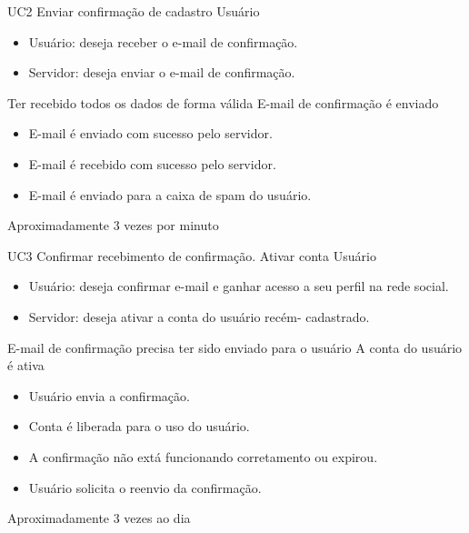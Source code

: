 \casoDeUso
{UC2}
{Enviar confirmação de cadastro}
{Usuário}
{
\begin{itemize}
	\item Usuário: deseja receber o e-mail de confirmação.
	\item Servidor: deseja enviar o e-mail de confirmação.
\end{itemize}

}
{Ter recebido todos os dados de forma válida}
{E-mail de confirmação é enviado}
{
\begin{itemize}
\item E-mail é enviado com sucesso pelo servidor.
\item E-mail é recebido com sucesso pelo servidor.
\end{itemize}
}
{
\begin{itemize}
\item E-mail é enviado para a caixa de spam do usuário.
\end{itemize}
}
{Aproximadamente 3 vezes por  minuto}
{
 
}

\casoDeUso
{UC3}
{Confirmar recebimento de confirmação. Ativar conta}
{Usuário}
{
\begin{itemize}
	\item Usuário: deseja confirmar e-mail e ganhar acesso a seu perfil na rede social.
	\item Servidor: deseja ativar a conta do usuário recém- cadastrado.
\end{itemize}

}
{E-mail de confirmação precisa ter sido enviado para o usuário}
{A conta do usuário é ativa}
{
\begin{itemize}
\item Usuário envia a confirmação.
\item Conta é liberada para o uso do usuário.
\end{itemize}
}
{
\begin{itemize}
\item A confirmação não extá funcionando corretamento ou expirou.
\item Usuário solicita o reenvio da confirmação.
\end{itemize}
}
{Aproximadamente 3 vezes ao dia}
{

}